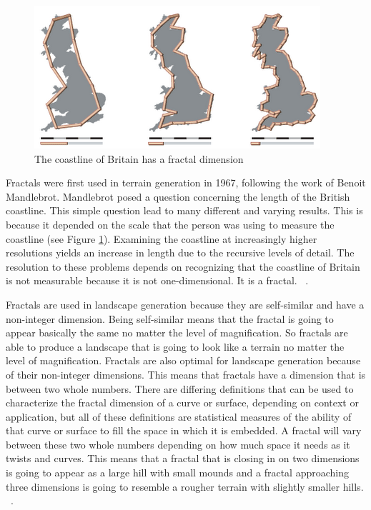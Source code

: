 \documentclass[11pt,twocolumn]{article}
\begin{document}
	\begin{figure}[ht]
	\includegraphics[scale=0.5]{BritainCoastline.png}
	\caption{The coastline of Britain has a fractal dimension}
	\label{fig:britcoast}
	\end{figure}
	Fractals were first used in terrain generation in 1967, following the work of Benoit Mandlebrot.
	Mandlebrot posed a question concerning the length of the British coastline.  This simple question
	lead to many different and varying results. This is because it depended on the scale that the person was using to measure the
	coastline (see Figure \ref{fig:britcoast}). Examining the coastline at increasingly higher resolutions yields an increase in
	length due to the recursive levels of detail. The resolution to these problems depends on recognizing that the coastline of Britain is not measurable because
	it is not one-dimensional. It is a fractal. ~\cite{Mandelbrot}.

	Fractals are used in landscape generation because they are self-similar and have a non-integer dimension. Being self-similar means
	that the fractal is going to appear basically the same no matter the level of magnification. So fractals are able to produce a landscape
	that is going to look like a terrain no matter the level of magnification. Fractals are also optimal for landscape generation because of
	their non-integer dimensions. This means that fractals have a dimension that is between two whole numbers.
	There are differing definitions that can be used to characterize the fractal dimension of a curve or surface, depending on context or
	application, but all of these definitions are statistical measures of the ability of that curve or surface to fill the space in which
	it is embedded. A fractal will vary between these two whole numbers depending on how much space it needs as it twists and curves.
	This means that a fractal that is closing in on two dimensions is going to appear as a large hill with small mounds and a fractal approaching three dimensions is going to resemble a
	rougher terrain with slightly smaller hills. ~\cite{Mandelbrot}.
\end{document}
